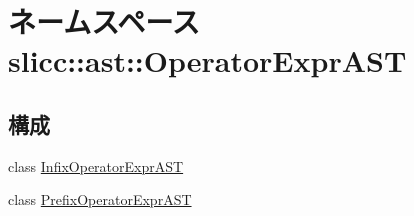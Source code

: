 \hypertarget{namespaceslicc_1_1ast_1_1OperatorExprAST}{
\section{ネームスペース slicc::ast::OperatorExprAST}
\label{namespaceslicc_1_1ast_1_1OperatorExprAST}
}
\subsection*{構成}
\begin{DoxyCompactItemize}
\item 
class \hyperlink{classslicc_1_1ast_1_1OperatorExprAST_1_1InfixOperatorExprAST}{InfixOperatorExprAST}
\item 
class \hyperlink{classslicc_1_1ast_1_1OperatorExprAST_1_1PrefixOperatorExprAST}{PrefixOperatorExprAST}
\end{DoxyCompactItemize}
